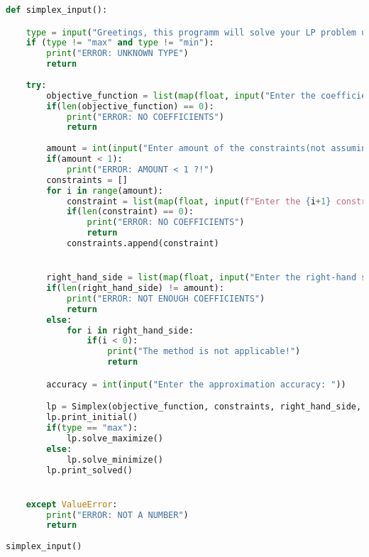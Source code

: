 \documentclass[12pt, legalpaper]{exam}
\begin{document}
\begin{lstlisting}[language=Python, caption=Программа на Python, label=lst:python-code]
def simplex_input():

    type = input("Greetings, this programm will solve your LP problem using Simplex method.\nEnter the type of the problem(Max/Min): ").lower()
    if (type != "max" and type != "min"):
        print("ERROR: UNKNOWN TYPE")
        return
    
    try:
        objective_function = list(map(float, input("Enter the coefficients of the objective function: ").split(" ")))
        if(len(objective_function) == 0):
            print("ERROR: NO COEFFICIENTS")
            return
        
        amount = int(input("Enter amount of the constraints(not assuming x>=0): "))
        if(amount < 1):
            print("ERROR: AMOUNT < 1 ?!")
        constraints = []
        for i in range(amount):
            constraint = list(map(float, input(f"Enter the {i+1} constraint function coefficients: ").split(" ")))
            if(len(constraint) == 0):
                print("ERROR: NO COEFFICIENTS")
                return
            constraints.append(constraint)


        right_hand_side = list(map(float, input("Enter the right-hand side numbers: ").split(" ")))
        if(len(right_hand_side) != amount):
            print("ERROR: NOT ENOUGH COEFFICIENTS")
            return
        else:
            for i in right_hand_side:
                if(i < 0):
                    print("The method is not applicable!")
                    return

        accuracy = int(input("Enter the approximation accuracy: "))

        lp = Simplex(objective_function, constraints, right_hand_side, accuracy)
        lp.print_initial()
        if(type == "max"):
            lp.solve_maximize()
        else:
            lp.solve_minimize()
        lp.print_solved()


    except ValueError:
        print("ERROR: NOT A NUMBER")
        return
    
simplex_input()
\end{lstlisting}
\end{document}
